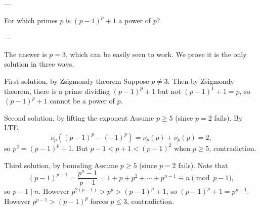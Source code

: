 
---

For which primes $p$ is $(p-1)^p+1$ a power of $p$?

---

The answer is $p=3$, which can be easily seen to work. We prove it is the only solution in three ways.
\begin{customenv}{First solution, by Zsigmondy theorem}
    Suppose $p\ne3$. Then by Zsigmondy theorem, there is a prime dividing $(p-1)^p+1$ but not $(p-1)^1+1=p$, so $(p-1)^p+1$ cannot be a power of $p$.
\end{customenv}
\begin{customenv}{Second solution, by lifting the exponent}
    Assume $p\ge5$ (since $p=2$ fails). By LTE, \[\nu_p\left( (p-1)^p-(-1)^p\right)=\nu_p(p)+\nu_p(p)=2,\]
    so $p^2=(p-1)^p+1$. But $p-1<p+1<(p-1)^2$ when $p\ge5$, contradiction.
\end{customenv}
\begin{customenv}{Third solution, by bounding}
    Assume $p\ge5$ (since $p=2$ fails). Note that \[(p-1)^{p-1}=\frac{p^n-1}{p-1}=1+p+p^2+\cdots+p^{n-1}\equiv n\pmod{p-1},\]
    so $p-1\mid n$. However $p^{2(p-1)}>p^p>(p-1)^p+1$, so $(p-1)^p+1=p^{p-1}$. However $p^{p-1}>(p-1)^p$ forces $p\le3$, contradiction.
\end{customenv}


